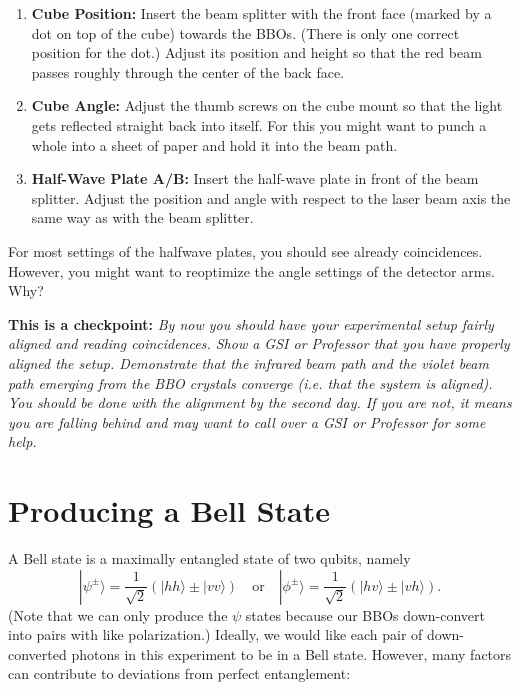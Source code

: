 \documentclass{../lab}
\begin{document}
\begin{enumerate}
    \item \textbf{Cube Position:} Insert the beam splitter with the front face (marked by a dot on top of the cube) towards the BBOs. (There is only one correct position for the dot.) Adjust its position and height so that the red beam passes roughly through the center of the back face.

    \item \textbf{Cube Angle:} Adjust the thumb screws on the cube mount so that the light gets reflected straight back into itself. For this you might want to punch a whole into a sheet of paper and hold it into the beam path.

    \item \textbf{Half-Wave Plate A/B:} Insert the half-wave plate in front of the beam splitter. Adjust the position and angle with respect to the laser beam axis the same way as with the beam splitter.
\end{enumerate}

For most settings of the halfwave plates, you should see already coincidences. However, you might want to reoptimize the angle settings of the detector arms. Why?

\textbf{This is a checkpoint:} \emph{By now you should have your experimental setup fairly aligned and reading coincidences. Show a GSI or Professor that you have properly aligned the setup. Demonstrate that the infrared beam path and the violet beam path emerging from the BBO crystals converge (i.e. that the system is aligned). You should be done with the alignment by the second day. If you are not, it means you are falling behind and may want to call over a GSI or Professor for some help. }

\section{Producing a Bell State}

A Bell state is a maximally entangled state of two qubits, namely
\begin{equation}
    |\psi^\pm\rangle = \frac{1}{\sqrt{2}}(|hh\rangle \pm |vv\rangle)
    \quad \text{or} \quad
    |\phi^\pm\rangle = \frac{1}{\sqrt{2}}(|hv\rangle \pm |vh\rangle).
\end{equation}
(Note that we can only produce the $\psi$ states because our BBOs down-convert into pairs with like polarization.) Ideally, we would like each pair of down-converted photons in this experiment to be in a Bell state. However, many factors can contribute to deviations from perfect entanglement:
\end{document}
